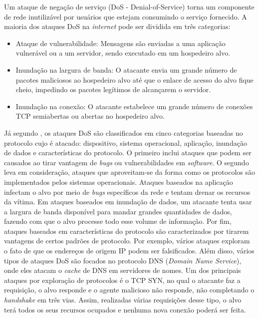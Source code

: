 Um ataque de negação de serviço (DoS - Denial-of-Service) torna um componente de rede inutilizável por usuários que estejam consumindo o serviço fornecido. A maioria dos ataques DoS na \textit{internet} pode ser dividida em três categorias: \cite{kurose}
\begin{itemize}
	\item Ataque de vulnerabilidade: Mensagens são enviadas a uma aplicação vulnerável ou a um servidor, sendo executado em um hospedeiro alvo.
	\item Inundação na largura de banda: O atacante envia um grande número de pacotes maliciosos ao hospedeiro alvo até que o enlace de acesso do alvo fique cheio, impedindo os pacotes legítimos de alcançarem o servidor. 
	\item Inundação na conexão: O atacante estabelece um grande número de conexões TCP semiabertas ou abertas no hospedeiro alvo. 
\end{itemize}

Já segundo , os ataques DoS são classificados em cinco categorias baseadas no protocolo cujo é atacado: dispositivo, sistema operacional, aplicação, inundação de dados e características do protocolo. O primeiro inclui ataques que podem ser causados ao tirar vantagem de \textit{bugs} ou vulnerabilidades em \textit{software}. O segundo leva em consideração, ataques que aproveitam-se da forma como os protocolos são implementados pelos sistemas operacionais. Ataques baseados na aplicação infectam o alvo por meio de \textit{bugs} específicos da rede e tentam drenar os recursos da vítima. Em ataques baseados em inundação de dados, um atacante tenta usar a largura de banda disponível para mandar grandes quantidades de dados, fazendo com que o alvo processe todo esse volume de informação. Por fim, ataques baseados em características do protocolo são caracterizados por tirarem vantagens de certos padrões de protocolo. Por exemplo, vários ataques exploram o fato de que os endereços de origem IP podem ser falsificados. Além disso, vários tipos de ataques DoS são focados no protocolo DNS (\textit{Domain Name Service}), onde eles atacam o \textit{cache} de DNS em servidores de nomes. Um dos principais ataques por exploração de protocolos é o TCP SYN, no qual o atacante faz a requisição, o alvo responde e o agente malicioso não responde, não completando o \textit{handshake} em três vias. Assim, realizadas várias requisições desse tipo, o alvo terá todos os seus recursos ocupados e nenhuma nova conexão poderá ser feita. 
 

